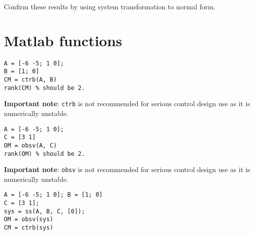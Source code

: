 Confirm these results by using system transformation to normal form.



 




\section*{Matlab functions} %
\label{sec:matlab_functions}

\begin{slide}
\begin{verbatim}
A = [-6 -5; 1 0];
B = [1; 0]
CM = ctrb(A, B)
rank(CM) % should be 2.
\end{verbatim}
\textbf{Important note}: \texttt{ctrb} is not recommended for serious control design use as it is numerically unstable.
\end{slide}

\begin{slide}
\begin{verbatim}
A = [-6 -5; 1 0];
C = [3 1]
OM = obsv(A, C)
rank(OM) % should be 2.
\end{verbatim}
\textbf{Important note}: \texttt{obsv} is not recommended for serious control design use as it is numerically unstable.
\end{slide}

\begin{slide}
\begin{verbatim}
A = [-6 -5; 1 0]; B = [1; 0]
C = [3 1];
sys = ss(A, B, C, [0]);
OM = obsv(sys)
CM = ctrb(sys)
\end{verbatim}
\end{slide}






\endinput

